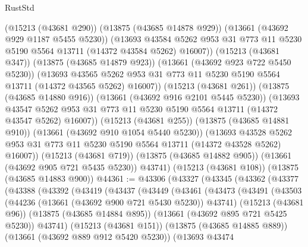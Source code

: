\begin{lexlean}{RustStd}
\begin{coremodule}
              (@15213 (@43681 @290))
              (@13875 (@43685 @14878 @929))
              (@13661 (@43692 @929 @1187 @5455 @5230))
              (@13693
                @43584
                @5262
                @953
                @31
                @773
                @11
                @5230
                @5190
                @5564
                @13711
                (@14372 @43584 @5262)
                @16007))
            (@15213 (@43681 @347))
            (@13875 (@43685 @14879 @923))
            (@13661 (@43692 @923 @722 @5450 @5230))
            (@13693
              @43565
              @5262
              @953
              @31
              @773
              @11
              @5230
              @5190
              @5564
              @13711
              (@14372 @43565 @5262)
              @16007))
          (@15213 (@43681 @261))
          (@13875 (@43685 @14880 @916))
          (@13661 (@43692 @916 @2101 @5445 @5230))
          (@13693
            @43547
            @5262
            @953
            @31
            @773
            @11
            @5230
            @5190
            @5564
            @13711
            (@14372 @43547 @5262)
            @16007))
        (@15213 (@43681 @255))
        (@13875 (@43685 @14881 @910))
        (@13661 (@43692 @910 @1054 @5440 @5230))
        (@13693
          @43528
          @5262
          @953
          @31
          @773
          @11
          @5230
          @5190
          @5564
          @13711
          (@14372 @43528 @5262)
          @16007))
      (@15213 (@43681 @719))
      (@13875 (@43685 @14882 @905))
      (@13661 (@43692 @905 @721 @5435 @5230))
      @43741)
    (@15213 (@43681 @108))
    (@13875 (@43685 @14883 @900))
@44361 := @43306
    (@43327
      (@43345
        (@43362
          (@43377
            (@43388
              (@43392
                (@43419
                  (@43437
                    (@43449
                      (@43461
                        (@43473
                          (@43491
                            (@43503
                              (@44236 (@13661 (@43692 @900 @721 @5430 @5230)) @43741)
                              (@15213 (@43681 @96))
                              (@13875 (@43685 @14884 @895))
                              (@13661 (@43692 @895 @721 @5425 @5230))
                              @43741)
                            (@15213 (@43681 @151))
                            (@13875 (@43685 @14885 @889))
                            (@13661 (@43692 @889 @912 @5420 @5230))
                            (@13693
                              @43474

\end{coremodule}
\end{lexlean}
